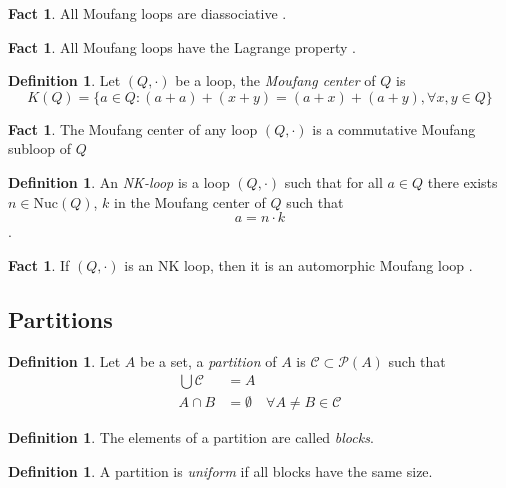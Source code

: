 \documentclass[12pt]{report}
\theoremstyle{definition}
\newtheorem{fct}[thm]{Fact}
\newtheorem{dfn}[thm]{Definition}
\newcommand{\nuc}{\text{Nuc}}       %
\begin{document}
\begin{fct}
  All Moufang loops are diassociative \cite{Moufang}.
\end{fct}

\begin{fct}
  All Moufang loops have the Lagrange property \cite{LG}. 
\end{fct}

\begin{dfn}
  Let $(Q,\cdot)$ be a loop, the \emph{Moufang center} of $Q$ is
  \[K(Q) = \{a\in Q : (a + a) + (x + y) = (a + x) + (a + y),\forall x, y\in Q\}\]\cite{KepkaKinyonPhillips}
\end{dfn}

\begin{fct}
  The Moufang center of any loop $(Q, \cdot)$ is a commutative Moufang subloop of $Q$ \cite{Bruck}
\end{fct}

\begin{dfn}
  An \emph{NK-loop} is a loop $(Q, \cdot)$ such that for all $a\in Q$ there exists $n\in \nuc(Q)$, $k$
    in the Moufang center of $Q$ such that
  \[a = n \cdot k\]
  \cite{KepkaKinyonPhillips}.
\end{dfn}

\begin{fct}
  If $(Q,\cdot)$ is an NK loop, then it is an automorphic Moufang loop \cite{KepkaKinyonPhillips}.
\end{fct}

\subsection{Partitions}

\begin{dfn}
  Let $A$ be a set, a \emph{partition} of $A$ is $\mathcal{C}\subset\mathcal{P}(A)$ such that
  \begin{align*}
    \bigcup \mathcal{C} &= A\\
    A\cap B &= \emptyset\quad \forall A\neq B\in\mathcal{C}
  \end{align*}
\end{dfn}

\begin{dfn}
  The elements of a partition are called \emph{blocks}.
\end{dfn}

\begin{dfn}
  A partition is \emph{uniform} if all blocks have the same size.
\end{dfn}
\end{document}
